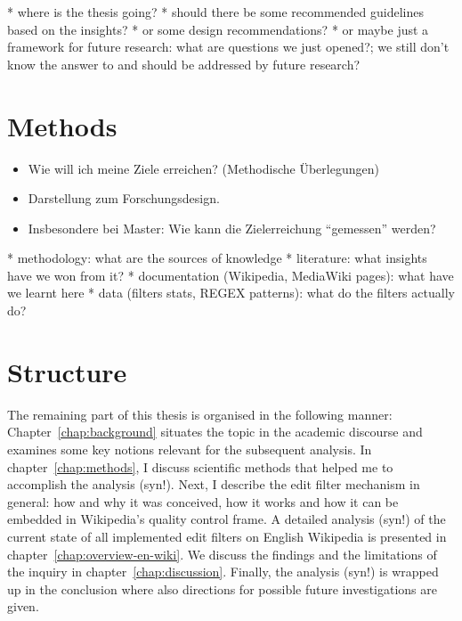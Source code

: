 
* where is the thesis going?
  * should there be some recommended guidelines based on the insights?
  * or some design recommendations?
  * or maybe just a framework for future research: what are questions we just opened?; we still don't know the answer to and should be addressed by future research?


\section{Methods}
\begin{itemize}
	\item Wie will ich meine Ziele erreichen? (Methodische Überlegungen)
	\item Darstellung zum Forschungsdesign.
	\item Insbesondere bei Master: Wie kann die Zielerreichung ``gemessen'' werden?
\end{itemize}

* methodology: what are the sources of knowledge
  * literature: what insights have we won from it?
  * documentation (Wikipedia, MediaWiki pages): what have we learnt here
  * data (filters stats, REGEX patterns): what do the filters actually do?

\section{Structure}

The remaining part of this thesis is organised in the following manner:
Chapter~\ref{chap:background} situates the topic in the academic discourse and examines some key notions relevant for the subsequent analysis.
In chapter~\ref{chap:methods}, I discuss scientific methods that helped me to accomplish the analysis (syn!).
Next, I describe the edit filter mechanism in general: how and why it was conceived, how it works and how it can be embedded in Wikipedia's quality control frame.
A detailed analysis (syn!) of the current state of all implemented edit filters on English Wikipedia is presented in chapter~\ref{chap:overview-en-wiki}.
We discuss the findings and the limitations of the inquiry in chapter~\ref{chap:discussion}.
Finally, the analysis (syn!) is wrapped up in the conclusion where also directions for possible future investigations are given.

